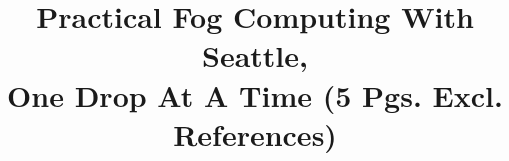 \documentclass[conference]{IEEEtran}
\begin{document}
\title{Practical Fog Computing With Seattle,\\
One Drop At A Time (5 Pgs. Excl. References)}


\author{
\and
{}
\and
{}
}

\maketitle







\end{document}

